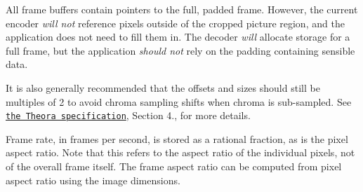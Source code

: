 All frame buffers contain pointers to the full, padded frame. However, the current encoder {\itshape will not} reference pixels outside of the cropped picture region, and the application does not need to fill them in. The decoder {\itshape will} allocate storage for a full frame, but the application {\itshape should not} rely on the padding containing sensible data.

It is also generally recommended that the offsets and sizes should still be multiples of 2 to avoid chroma sampling shifts when chroma is sub-\/sampled. See \href{http://www.theora.org/doc/Theora.pdf}{\tt the Theora specification}, Section 4., for more details.

Frame rate, in frames per second, is stored as a rational fraction, as is the pixel aspect ratio. Note that this refers to the aspect ratio of the individual pixels, not of the overall frame itself. The frame aspect ratio can be computed from pixel aspect ratio using the image dimensions. 

